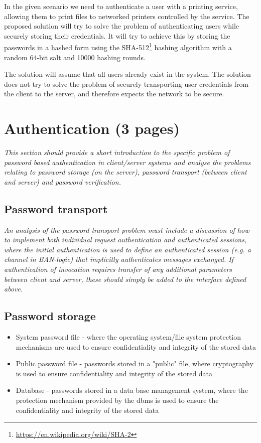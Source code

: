 \documentclass[12pt]{article}
\begin{document}
In the given scenario we need to authenticate a user with a printing service, allowing them to print files to networked printers controlled by the service. The proposed solution will try to solve the problem of authenticating users while securely storing their credentials. It will try to achieve this by storing the passwords in a hashed form using the SHA-512\footnote{\url{https://en.wikipedia.org/wiki/SHA-2}} hashing algorithm with a random 64-bit salt and 10000 hashing rounds.

The solution will assume that all users already exist in the system.
The solution does not try to solve the problem of securely transporting user credentials from the client to the server, and therefore expects the network to be secure.

\newpage

\section{Authentication (3 pages)}
\label{sec:Authentication}

\textit{This section should provide a short introduction to the specific problem of password based authentication in client/server systems and analyse the problems relating to password storage (on the server), password transport (between client and server) and password verification.}

\subsection{Password transport}
\label{sub:Password transport}

\textit{An analysis of the password transport problem must include a discussion of how to implement both individual request authentication and authenticated sessions, where the initial authentication is used to define an authenticated session (e.g. a channel in BAN-logic) that implicitly authenticates messages exchanged. If authentication of invocation requires transfer of any additional parameters between client and server, these should simply be added to the interface defined above.}

\subsection{Password storage}
\label{sub:Password storage}

\begin{itemize}
    \item System password file - where the operating system/file system protection mechanisms are used to ensure confidentiality and integrity of the stored data
    \item Public password file - passwords stored in a "public" file, where cryptography is used to ensure confidentiality and integrity of the stored data
    \item Database - passwords stored in a data base management system, where the protection mechanism provided by the dbms is used to ensure the confidentiality and integrity of the stored data
\end{itemize}
\end{document}
